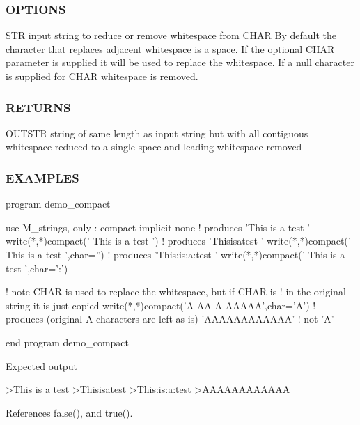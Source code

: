 \subsubsection*{O\+P\+T\+I\+O\+NS}

S\+TR input string to reduce or remove whitespace from C\+H\+AR By default the character that replaces adjacent whitespace is a space. If the optional C\+H\+AR parameter is supplied it will be used to replace the whitespace. If a null character is supplied for C\+H\+AR whitespace is removed. \subsubsection*{R\+E\+T\+U\+R\+NS}

O\+U\+T\+S\+TR string of same length as input string but with all contiguous whitespace reduced to a single space and leading whitespace removed

\subsubsection*{E\+X\+A\+M\+P\+L\+ES}

\begin{DoxyVerb}program demo_compact

 use M_strings, only : compact
 implicit none
 ! produces 'This is a test               '
 write(*,*)compact('  This     is      a     test  ')
 ! produces 'Thisisatest                  '
 write(*,*)compact('  This     is      a     test  ',char='')
 ! produces 'This:is:a:test               '
 write(*,*)compact('  This     is      a     test  ',char=':')

 ! note CHAR is used to replace the whitespace, but if CHAR is
 ! in the original string it is just copied
 write(*,*)compact('A  AA    A   AAAAA',char='A')
 ! produces (original A characters are left as-is) 'AAAAAAAAAAAA'
 ! not 'A'

end program demo_compact

Expected output

 >This is a test
 >Thisisatest
 >This:is:a:test
 >AAAAAAAAAAAA \end{DoxyVerb}
 

References false(), and true().

\mbox{\label{namespacem__strings_a818d715927dd61c1be6df5d2cdec4e4c}} 
